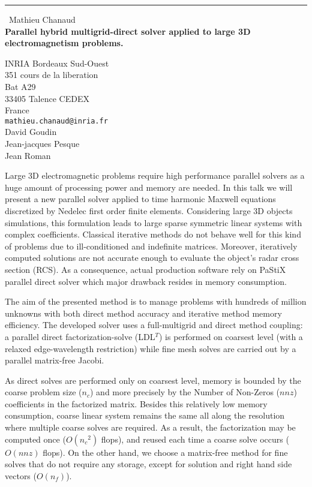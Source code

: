 \documentclass{report}
\begin{document}
\begin{center}
\rule{6in}{1pt} \
{\large Mathieu Chanaud \\
{\bf Parallel hybrid multigrid-direct solver applied to large 3D electromagnetism problems. }}

INRIA Bordeaux Sud-Ouest \\ 351 cours de la liberation \\ Bat A29 \\ 33405 Talence CEDEX \\ France
\\
{\tt mathieu.chanaud@inria.fr}\\
David Goudin\\
Jean-jacques Pesque\\
Jean Roman\end{center}

Large 3D electromagnetic problems require high
performance parallel solvers as a huge amount of
processing power and memory are needed. In this
talk we will present a new parallel solver applied
to time harmonic Maxwell equations discretized by
Nedelec first order finite elements. Considering
large 3D objects simulations, this formulation
leads to large sparse symmetric linear systems
with complex coefficients. Classical iterative
methods do not behave well for this kind of
problems due to ill-conditioned and indefinite
matrices. Moreover, iteratively computed solutions
are not accurate enough to evaluate the object's
radar cross section (RCS). As a consequence,
actual production software rely on PaStiX parallel
direct solver which major drawback resides in
memory consumption.

The aim of the presented method is to manage
problems with hundreds of million unknowns with
both direct method accuracy and iterative method
memory efficiency. The developed solver uses a
full-multigrid and direct method coupling: a
parallel direct factorization-solve (LDL$^T$) is
performed on coarsest level (with a relaxed
edge-wavelength restriction) while fine mesh
solves are carried out by a parallel matrix-free
Jacobi.

As direct solves are performed only on coarsest
level, memory is bounded by the coarse problem
size ($n_c$) and more precisely by the Number of
Non-Zeros ($nnz$) coefficients in the factorized
matrix. Besides this relatively low memory
consumption, coarse linear system remains the same
all along the resolution where multiple coarse
solves are required. As a result, the
factorization may be computed once ($O({n_c}^2)$
flops), and reused each time a coarse solve occurs
($O(nnz)$ flops). On the other hand, we choose a
matrix-free method for fine solves that do not
require any storage, except for solution and right
hand side vectors ($O(n_f)$).
\end{document}
